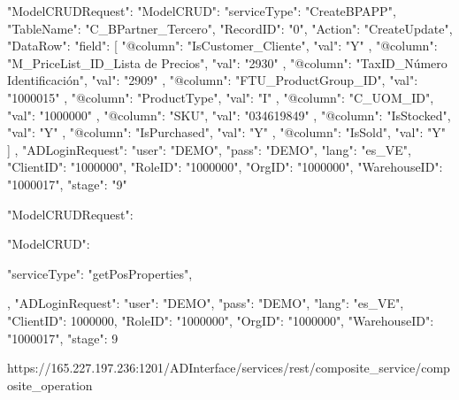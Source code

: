 {
    "ModelCRUDRequest": {
        "ModelCRUD": {
            "serviceType": "CreateBPAPP",
            "TableName": "C_BPartner_Tercero",
            "RecordID": "0",
            "Action": "CreateUpdate",
            "DataRow": {
                "field": [
                    {
                        "@column": "IsCustomer_Cliente",
                        "val": "Y"
                    },
                    {
                        "@column": "M_PriceList_ID_Lista de Precios",
                        "val": "2930"
                    },
                    {
                        "@column": "TaxID_Número Identificación",
                        "val": "2909"
                    },
                    {
                        "@column": "FTU_ProductGroup_ID",
                        "val": "1000015"
                    },
                    {
                        "@column": "ProductType",
                        "val": "I"
                    },
                    {
                        "@column": "C_UOM_ID",
                        "val": "1000000"
                    },
                    {
                        "@column": "SKU",
                        "val": "034619849"
                    },
                    {
                        "@column": "IsStocked",
                        "val": "Y"
                    },
                    {
                        "@column": "IsPurchased",
                        "val": "Y"
                    },
                    {
                        "@column": "IsSold",
                        "val": "Y"
                    }
                ]
            }
        },
        "ADLoginRequest": {
            "user": "DEMO",
            "pass": "DEMO",
            "lang": "es_VE",
            "ClientID": "1000000",
            "RoleID": "1000000",
            "OrgID": "1000000",
            "WarehouseID": "1000017",
            "stage": "9"
        }
    }
}



{
    "ModelCRUDRequest": {
        "ModelCRUD": {
            "serviceType": "getPosProperties",
           
        },
        "ADLoginRequest": {
            "user": "DEMO",
            "pass": "DEMO",
            "lang": "es_VE",
            "ClientID": 1000000,
            "RoleID": "1000000",
            "OrgID": "1000000",
            "WarehouseID": "1000017",
            "stage": 9
        }
    }
}




https://165.227.197.236:1201/ADInterface/services/rest/composite_service/composite_operation


